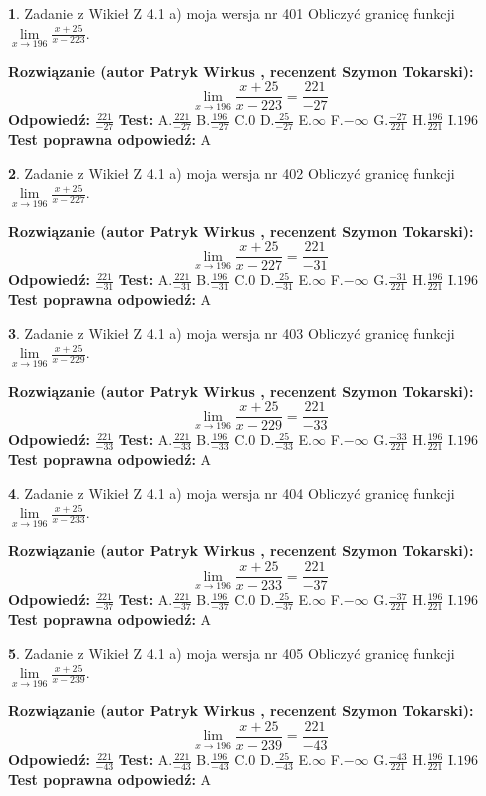\documentclass[12pt, a4paper]{article}
\theoremstyle{definition} %
\newtheorem{zad}{}
\newcommand{\zadStart}[1]{\begin{zad}#1\newline}
\newcommand{\zadStop}{\end{zad}}
\newcommand{\rozwStart}[2]{\noindent \textbf{Rozwiązanie (autor #1 , recenzent #2): }\newline}
\newcommand{\rozwStop}{\newline}
\newcommand{\odpStart}{\noindent \textbf{Odpowiedź:}\newline}
\newcommand{\odpStop}{\newline}
\newcommand{\testStart}{\noindent \textbf{Test:}\newline}
\newcommand{\testStop}{\newline}
\newcommand{\kluczStart}{\noindent \textbf{Test poprawna odpowiedź:}\newline}
\newcommand{\kluczStop}{\newline}
\begin{document}
\zadStart{Zadanie z Wikieł Z 4.1 a) moja wersja nr 401}
Obliczyć granicę funkcji $\lim\limits_{x\to196}\frac{x+25}{x-223}$.
\zadStop
\rozwStart{Patryk Wirkus}{Szymon Tokarski}
$$\lim\limits_{x\to196}\frac{x+25}{x-223} = \frac{221}{-27}$$
\rozwStop
\odpStart
$\frac{221}{-27}$
\odpStop
\testStart
A.$\frac{221}{-27}$
B.$\frac{196}{-27}$
C.$0$
D.$\frac{25}{-27}$
E.$\infty$
F.$-\infty$
G.$\frac{-27}{221}$
H.$\frac{196}{221}$
I.$196$
\testStop
\kluczStart
A
\kluczStop



\zadStart{Zadanie z Wikieł Z 4.1 a) moja wersja nr 402}
Obliczyć granicę funkcji $\lim\limits_{x\to196}\frac{x+25}{x-227}$.
\zadStop
\rozwStart{Patryk Wirkus}{Szymon Tokarski}
$$\lim\limits_{x\to196}\frac{x+25}{x-227} = \frac{221}{-31}$$
\rozwStop
\odpStart
$\frac{221}{-31}$
\odpStop
\testStart
A.$\frac{221}{-31}$
B.$\frac{196}{-31}$
C.$0$
D.$\frac{25}{-31}$
E.$\infty$
F.$-\infty$
G.$\frac{-31}{221}$
H.$\frac{196}{221}$
I.$196$
\testStop
\kluczStart
A
\kluczStop



\zadStart{Zadanie z Wikieł Z 4.1 a) moja wersja nr 403}
Obliczyć granicę funkcji $\lim\limits_{x\to196}\frac{x+25}{x-229}$.
\zadStop
\rozwStart{Patryk Wirkus}{Szymon Tokarski}
$$\lim\limits_{x\to196}\frac{x+25}{x-229} = \frac{221}{-33}$$
\rozwStop
\odpStart
$\frac{221}{-33}$
\odpStop
\testStart
A.$\frac{221}{-33}$
B.$\frac{196}{-33}$
C.$0$
D.$\frac{25}{-33}$
E.$\infty$
F.$-\infty$
G.$\frac{-33}{221}$
H.$\frac{196}{221}$
I.$196$
\testStop
\kluczStart
A
\kluczStop



\zadStart{Zadanie z Wikieł Z 4.1 a) moja wersja nr 404}
Obliczyć granicę funkcji $\lim\limits_{x\to196}\frac{x+25}{x-233}$.
\zadStop
\rozwStart{Patryk Wirkus}{Szymon Tokarski}
$$\lim\limits_{x\to196}\frac{x+25}{x-233} = \frac{221}{-37}$$
\rozwStop
\odpStart
$\frac{221}{-37}$
\odpStop
\testStart
A.$\frac{221}{-37}$
B.$\frac{196}{-37}$
C.$0$
D.$\frac{25}{-37}$
E.$\infty$
F.$-\infty$
G.$\frac{-37}{221}$
H.$\frac{196}{221}$
I.$196$
\testStop
\kluczStart
A
\kluczStop



\zadStart{Zadanie z Wikieł Z 4.1 a) moja wersja nr 405}
Obliczyć granicę funkcji $\lim\limits_{x\to196}\frac{x+25}{x-239}$.
\zadStop
\rozwStart{Patryk Wirkus}{Szymon Tokarski}
$$\lim\limits_{x\to196}\frac{x+25}{x-239} = \frac{221}{-43}$$
\rozwStop
\odpStart
$\frac{221}{-43}$
\odpStop
\testStart
A.$\frac{221}{-43}$
B.$\frac{196}{-43}$
C.$0$
D.$\frac{25}{-43}$
E.$\infty$
F.$-\infty$
G.$\frac{-43}{221}$
H.$\frac{196}{221}$
I.$196$
\testStop
\kluczStart
A
\kluczStop
\end{document}
